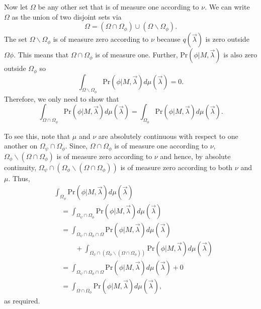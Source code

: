 \documentclass[DIV=calc,fontsize=12pt]{scrartcl} %
\theoremstyle{definition}
\theoremstyle{plain}
\begin{document}
Now let $\Omega$ be any other set that is of measure one according to
$\nu$.  We can write $\Omega$ as the union of two disjoint sets via
\begin{equation}
\Omega = \left (\Omega \cap \Omega_{\phi} \right) \cup \left ( \Omega
\backslash \Omega_{\phi} \right ).
\end{equation}
The set $\Omega \backslash \Omega_{\phi}$ is of measure zero according
to $\nu$ because $q(\vec{\lambda})$ is zero outside $\Omega{\phi}$.
This means that $\Omega \cap \Omega_{\phi}$ is of measure one.
Further, $\text{Pr}(\phi|M,\vec{\lambda})$ is also zero outside
$\Omega_{\phi}$ so
\begin{equation}
\int_{\Omega \backslash \Omega_{\phi}} \text{Pr}(\phi|M,\vec{\lambda})
d\mu(\vec{\lambda}) = 0.
\end{equation}
Therefore, we only need to show that
\begin{equation}
\int_{\Omega \cap \Omega_{\phi}} \text{Pr}(\phi|M,\vec{\lambda})
d\mu(\vec{\lambda}) =   \int_{\Omega_{\phi}} \text{Pr}(\phi|M,\vec{\lambda})
d\mu(\vec{\lambda}).
\end{equation}

To see this, note that $\mu$ and $\nu$ are absolutely continuous with
respect to one another on $\Omega_{\psi} \cap \Omega_{\phi}$.  Since,
$\Omega \cap \Omega_{\phi}$ is of measure one according to $\nu$,
$\Omega_{\phi} \backslash \left ( \Omega \cap \Omega_{\phi} \right )$
is of measure zero according to $\nu$ and hence, by absolute
continuity, $\Omega_{\psi} \cap \left ( \Omega_{\phi} \backslash \left
( \Omega \cap \Omega_{\phi} \right ) \right )$ is of measure zero
according to both $\nu$ and $\mu$.  Thus,
\begin{align}
& \int_{\Omega_{\phi}} \text{Pr}(\phi|M,\vec{\lambda}) d\mu(\vec{\lambda})\nonumber\\
&\quad = \int_{\Omega_{\psi} \cap \Omega_{\phi}}\text{Pr}(\phi|M,\vec{\lambda})
d\mu(\vec{\lambda}) \\
&\quad = \int_{\Omega_{\psi} \cap \Omega_{\phi} \cap \Omega}
\text{Pr}(\phi|M,\vec{\lambda}) d\mu(\vec{\lambda}) \nonumber\\
&\quad\quad\quad + \int_{\Omega _{\psi} \cap
\left (\Omega_{\phi} \backslash \left (\Omega \cap
\Omega_{\phi} \right ) \right )} \text{Pr}(\phi|M,\vec{\lambda})
d\mu(\vec{\lambda}) \\
&\quad = \int_{\Omega_{\psi} \cap \Omega_{\phi} \cap \Omega}
\text{Pr}(\phi|M,\vec{\lambda}) d\mu(\vec{\lambda}) + 0 \\
&\quad = \int_{\Omega \cap \Omega_{\phi}} \text{Pr}(\phi|M,\vec{\lambda})
d\mu(\vec{\lambda}),
\end{align}
as required.
\end{document}
